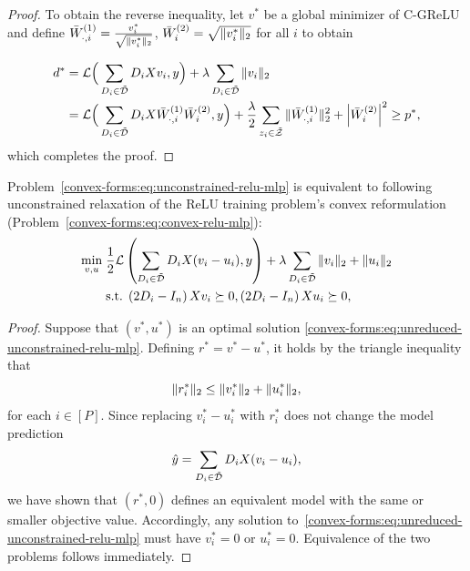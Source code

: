 \begin{proof}
    To obtain the reverse inequality, let \( v^* \) be a global minimizer of C-GReLU and define \( \bar{W}^{(1)}_{\cdot, i} = \frac{v_i^*}{\sqrt{\|v_i^*\|_2}} \), \( \bar{W}^{(2)}_{i} = \sqrt{\|v_i^*\|_2} \) for all \( i \) to obtain

    \begin{align*}
        d^*
         & = \mathcal{L}\Big(\sum_{D_i \in \tilde {\mathcal{D}}} D_i X v_i, y\Big)+ \lambda \sum_{D_i \in \tilde {\mathcal{D}}} \|v_i\|_2                                                                                                       \\
         & = \mathcal{L}\Big(\sum_{D_i \in \tilde {\mathcal{D}} } D_i X \bar{W}^{(1)}_{\cdot, i} \bar{W}^{(2)}_{i}, y\Big) + \frac{\lambda}{2} \sum_{z_i \in \tilde {\mathcal{Z}}} \|\bar{W}^{(1)}_{\cdot, i}\|^2_2 + \left\vert \bar{W}^{(2)}_{i}\right\vert^2
        \geq p^*,
    \end{align*}
    which completes the proof.

\end{proof}


\begin{proposition}\label{prop:unconstrained-relu-mlp}
    Problem~\ref{convex-forms:eq:unconstrained-relu-mlp} is equivalent to following unconstrained relaxation of the ReLU training problem's convex reformulation (Problem~\ref{convex-forms:eq:convex-relu-mlp}):
    \begin{equation} \label{convex-forms:eq:unreduced-unconstrained-relu-mlp}
        \begin{aligned}
            \min_{v, u} \;
             & \frac 1 2 \mathcal{L}\left(\sum_{D_i \in \tilde {\mathcal{D}}} D_i X (v_i - u_i), y\right) + \lambda \sum_{D_i \in \tilde {\mathcal{D}}} \|v_i\|_2 + \|u_i\|_2 \\
             & \text{s.t.} \;  \left(2 D_i - I_n\right) X v_i \succeq 0, \left(2 D_i - I_n\right) X u_i \succeq 0,
        \end{aligned}
    \end{equation}
\end{proposition}
\begin{proof}
    Suppose that \( (v^*, u^*) \) is an optimal solution \eqref{convex-forms:eq:unreduced-unconstrained-relu-mlp}.
    Defining \( r^* = v^* - u^* \), it holds by the triangle inequality that
    \begin{equation*}
        \|r_i^*\|_2 \leq \|v_i^*\|_2 + \|u_i^*\|_2,
    \end{equation*}
    for each \( i \in [P] \).
    Since replacing \( v_i^* - u_i^* \) with \( r_i^* \) does not change the model prediction
    \[ \hat y = \sum_{D_i \in \tilde {\mathcal{D}}} D_i X(v_i - u_i), \]
    we have shown that \( (r^*, 0) \) defines an equivalent model with the same or smaller objective value.
    Accordingly, any solution to~\eqref{convex-forms:eq:unreduced-unconstrained-relu-mlp} must have
    \( v_i^* = 0 \) or \( u_i^* = 0 \).
    Equivalence of the two problems follows immediately.
\end{proof}

